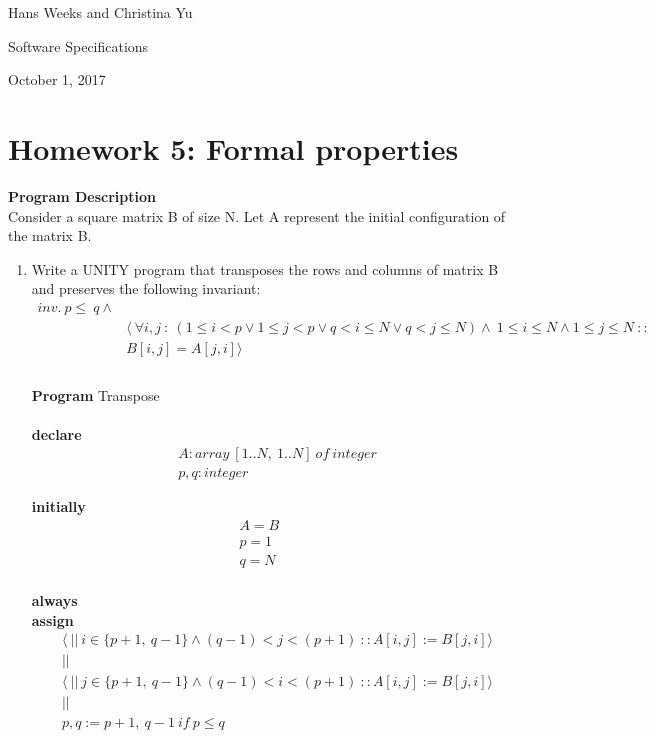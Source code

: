 \documentclass{article}
\begin{document}
\hfill Hans Weeks and Christina Yu

\hfill Software Specifications

\hfill October 1, 2017
\section*{Homework 5: Formal properties}
\textbf{Program Description}\\
Consider a square matrix B of size N. Let A represent the initial configuration of the matrix B. \\
\begin{enumerate}
\item
Write a UNITY program that transposes the rows and columns of matrix B and preserves the following invariant:\\
\begin{align*}
 inv. \ p \leq \ q \wedge \\
&\langle \ \forall i,j \ : \ (1\leq i <p \vee 1 \leq j<p \vee q<i \leq N \vee q<j \leq N) \wedge \ 1 \leq i \leq N \wedge 1 \leq j \leq N \ :: \\ 
&B[i,j]=A[j,i]\rangle\\
\end{align*}
\\
\textbf{Program} Transpose\\
\\
\textbf{declare}\\
\begin{align*}
&A: array \ [1..N,\ 1..N]\ of \ integer\\
&p, q: integer
\end{align*}

\textbf{initially}\\
\begin{align*}
A=B\quad&\\
p=1\quad&\\
q=N\quad&\\
\end{align*}


\textbf{always}\\
\textbf{assign}\\
\begin{align*}
&\langle \ || \ i \in\{p+1, \ q-1\} \wedge (q-1)< j < (p+1) \ ::  A[i,j]:=B[j,i]\rangle\\
&||\\
&\langle \ || \ j \in\{p+1, \ q-1\} \wedge (q-1)< i < (p+1) \ ::  A[i,j]:=B[j,i]\rangle\\
&||\\
&p,q := p+1,\ q-1\ if\ p \leq q
\end{align*}


\end{enumerate}
\end{document}
